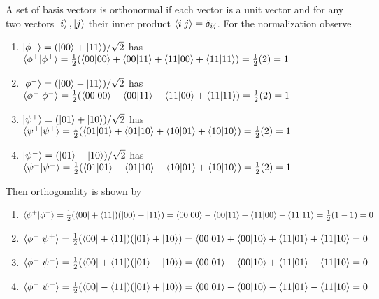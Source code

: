 \documentclass[12pt]{exam}
\begin{document}
\begin{solution}

    A set of basis vectors is orthonormal if each vector is a unit vector and for any two vectors $\ket{i},\ket{j}$ their inner product $\braket{i}{j}=\delta_{ij}$. For the normalization observe 
    
    \begin{enumerate}
        \item $\ket{\phi^+} = (\ket{00}+\ket{11})/\sqrt{2}$ has $\braket{\phi^+}=\frac{1}{2}(\braket{00}+\braket{00}{11}+\braket{11}{00}+\braket{11})= \frac{1}{2}(2)=1$
        
        \item $\ket{\phi^-} = (\ket{00}-\ket{11})/\sqrt{2}$ has $\braket{\phi^-}=\frac{1}{2}(\braket{00}-\braket{00}{11}-\braket{11}{00}+\braket{11})= \frac{1}{2}(2)=1$

        \item $\ket{\psi^+} = (\ket{01}+\ket{10})/\sqrt{2}$ has $\braket{\psi^+}=\frac{1}{2}(\braket{01}+\braket{01}{10}+\braket{10}{01}+\braket{10})= \frac{1}{2}(2)=1$
        
        \item $\ket{\psi^-} = (\ket{01}-\ket{10})/\sqrt{2}$ has $\braket{\psi^-}=\frac{1}{2}(\braket{01}-\braket{01}{10}-\braket{10}{01}+\braket{10})= \frac{1}{2}(2)=1$
    \end{enumerate}

    Then orthogonality is shown by 
    
    \begin{enumerate}
        \item $\braket{\phi^+}{\phi^-}= \frac{1}{2}(\bra{00}+\bra{11})(\ket{00}-\ket{11})
            = \braket{00}-\braket{00}{11}+\braket{11}{00}-\braket{11}=\frac{1}{2}(1-1)=0$

        \item $\braket{\phi^+}{\psi^+}= \frac{1}{2}(\bra{00}+\bra{11})(\ket{01}+\ket{10})
            = \braket{00}{01}+\braket{00}{10}+\braket{11}{01}+\braket{11}{10}=0$

        \item $\braket{\phi^+}{\psi^-}= \frac{1}{2}(\bra{00}+\bra{11})(\ket{01}-\ket{10})
            = \braket{00}{01}-\braket{00}{10}+\braket{11}{01}-\braket{11}{10}=0$

        \item $\braket{\phi^-}{\psi^+}= \frac{1}{2}(\bra{00}-\bra{11})(\ket{01}+\ket{10})
            = \braket{00}{01}+\braket{00}{10}-\braket{11}{01}-\braket{11}{10}=0$


\end{enumerate}
\end{solution}
\end{document}
